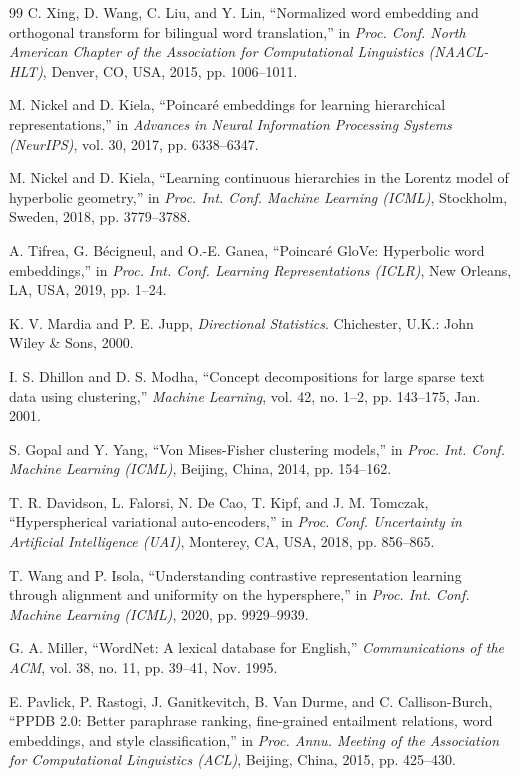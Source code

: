 \documentclass[journal]{IEEEtran}
\begin{document}
\begin{thebibliography}{99}
C. Xing, D. Wang, C. Liu, and Y. Lin, ``Normalized word embedding and orthogonal transform for bilingual word translation,'' in \emph{Proc. Conf. North American Chapter of the Association for Computational Linguistics (NAACL-HLT)}, Denver, CO, USA, 2015, pp. 1006--1011.

M. Nickel and D. Kiela, ``Poincar\'{e} embeddings for learning hierarchical representations,'' in \emph{Advances in Neural Information Processing Systems (NeurIPS)}, vol. 30, 2017, pp. 6338--6347.

M. Nickel and D. Kiela, ``Learning continuous hierarchies in the Lorentz model of hyperbolic geometry,'' in \emph{Proc. Int. Conf. Machine Learning (ICML)}, Stockholm, Sweden, 2018, pp. 3779--3788.

A. Tifrea, G. B\'{e}cigneul, and O.-E. Ganea, ``Poincar\'{e} GloVe: Hyperbolic word embeddings,'' in \emph{Proc. Int. Conf. Learning Representations (ICLR)}, New Orleans, LA, USA, 2019, pp. 1--24.

K. V. Mardia and P. E. Jupp, \emph{Directional Statistics}. Chichester, U.K.: John Wiley \& Sons, 2000.

I. S. Dhillon and D. S. Modha, ``Concept decompositions for large sparse text data using clustering,'' \emph{Machine Learning}, vol. 42, no. 1--2, pp. 143--175, Jan. 2001.

S. Gopal and Y. Yang, ``Von Mises-Fisher clustering models,'' in \emph{Proc. Int. Conf. Machine Learning (ICML)}, Beijing, China, 2014, pp. 154--162.

T. R. Davidson, L. Falorsi, N. De Cao, T. Kipf, and J. M. Tomczak, ``Hyperspherical variational auto-encoders,'' in \emph{Proc. Conf. Uncertainty in Artificial Intelligence (UAI)}, Monterey, CA, USA, 2018, pp. 856--865.

T. Wang and P. Isola, ``Understanding contrastive representation learning through alignment and uniformity on the hypersphere,'' in \emph{Proc. Int. Conf. Machine Learning (ICML)}, 2020, pp. 9929--9939.

G. A. Miller, ``WordNet: A lexical database for English,'' \emph{Communications of the ACM}, vol. 38, no. 11, pp. 39--41, Nov. 1995.

E. Pavlick, P. Rastogi, J. Ganitkevitch, B. Van Durme, and C. Callison-Burch, ``PPDB 2.0: Better paraphrase ranking, fine-grained entailment relations, word embeddings, and style classification,'' in \emph{Proc. Annu. Meeting of the Association for Computational Linguistics (ACL)}, Beijing, China, 2015, pp. 425--430.


\end{thebibliography}
\end{document}
